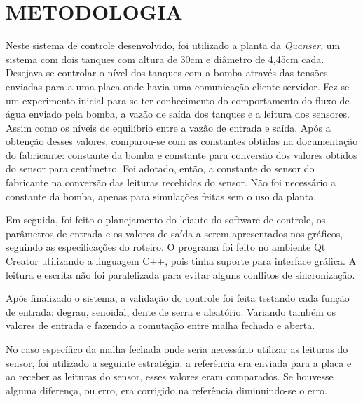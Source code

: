 \documentclass[a4paper,12pt]{article}
\begin{document}
\newpage


\thispagestyle{main}

\section{METODOLOGIA}


\hspace{4ex}Neste sistema de controle desenvolvido, foi utilizado a planta da \textit{Quanser}, um sistema com dois tanques com altura de 30cm e diâmetro de 4,45cm cada. Desejava-se controlar o nível dos tanques com a bomba através das tensões enviadas para a uma placa onde havia uma comunicação cliente-servidor. Fez-se um experimento inicial para se ter conhecimento do comportamento do fluxo de água enviado pela bomba, a vazão de saída dos tanques e a leitura dos sensores. Assim como os níveis de equilíbrio entre a vazão de entrada e saída. Após a obtenção desses valores, comparou-se com as constantes obtidas na documentação do fabricante: constante da bomba e constante para conversão dos valores obtidos do sensor para centímetro. Foi adotado, então, a constante do  sensor do fabricante na conversão das leituras recebidas do sensor. Não foi necessário a constante da bomba, apenas para simulações feitas sem o uso da planta.

Em seguida, foi feito o planejamento do leiaute do software de controle, os parâmetros de entrada e os valores de saída a serem apresentados nos gráficos, seguindo as especificações do roteiro. O programa foi feito no ambiente Qt Creator utilizando a linguagem C++, pois tinha suporte para interface gráfica. A leitura e escrita não foi paralelizada para evitar alguns conflitos de sincronização. 

Após finalizado o sistema, a validação do controle foi feita testando cada função de entrada: degrau, senoidal, dente de serra e aleatório. Variando também os valores de entrada e fazendo a comutação entre malha fechada e aberta. 

No caso específico da malha fechada onde seria necessário utilizar as leituras do sensor, foi utilizado a seguinte estratégia: a referência era enviada para a placa e ao receber as leituras do sensor, esses valores eram comparados. Se houvesse alguma diferença, ou erro, era corrigido na referência diminuindo-se o erro.


\newpage

\end{document}
